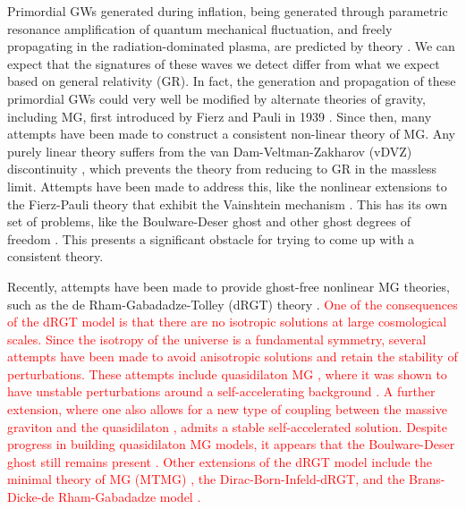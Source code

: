 \documentclass[prd,twocolumn,aps,psfig,nofootinbib,nobibnotes,superscriptaddress,preprintnumbers,times]{revtex4-2}
\def\red{\textcolor{red}}
\begin{document}
Primordial GWs generated during inflation, being generated through parametric resonance amplification of quantum mechanical fluctuation, and freely propagating in the radiation-dominated plasma, are predicted by theory 
\cite{Grishchuk:1976,Grishchuk:1977zz,Starobinsky:1980te,Linde:1981mu,Fabbri:1983us}. We can expect that the signatures of these waves we detect differ from what we expect based on general relativity (GR). In fact, the generation and propagation of these primordial GWs could very well be modified by alternate theories of gravity, including MG, first introduced by Fierz and Pauli in 1939 \cite{Fierz:1939ix}. Since then, many attempts have been made to construct a consistent non-linear theory of MG. Any purely linear theory suffers from the van Dam-Veltman-Zakharov (vDVZ) discontinuity \cite{vanDam:1970vg,Zakharov:1970cc}, which prevents the theory from reducing to GR in the massless limit. Attempts have been made to address this, like the nonlinear extensions to the Fierz-Pauli theory that exhibit the Vainshtein mechanism \cite{Vainshtein:1972sx}. This has its own set of problems, like the Boulware-Deser ghost and other ghost degrees of freedom \cite{Boulware:1972yco,Dubovsky:2004sg}. This presents a significant obstacle for trying to come up with a consistent theory.

Recently, attempts have been made to provide ghost-free nonlinear MG  theories, such as the de Rham-Gabadadze-Tolley (dRGT) theory \cite{Hassan:2011tf, Hassan:2011ea, deRham:2010ik,deRham:2010kj}. \red{One of the consequences of the dRGT model is that there are no isotropic solutions at large cosmological scales. Since the isotropy of the universe is a fundamental symmetry, several attempts have been made to avoid anisotropic solutions and retain the stability of perturbations. These attempts include quasidilaton MG \cite{DAmico:2012hia}, where it was shown to have unstable perturbations around a self-accelerating background \cite{Gumrukcuoglu:2013nza}. A further extension, where one also allows for a new type of coupling between the massive graviton and the quasidilaton \cite{DeFelice:2013tsa}, admits a stable self-accelerated solution. Despite progress in building quasidilaton MG models, it appears that the Boulware-Deser ghost still remains present \cite{Mukohyama:2013raa}. Other extensions of the dRGT model include the minimal theory of MG (MTMG) \cite{DeFelice:2015hla,DeFelice:2015moy}, the Dirac-Born-Infeld-dRGT\cite{Kazempour:2022giy}, and the Brans-Dicke-de Rham-Gabadadze model \cite{Kazempour:2022let}.}
\end{document}
